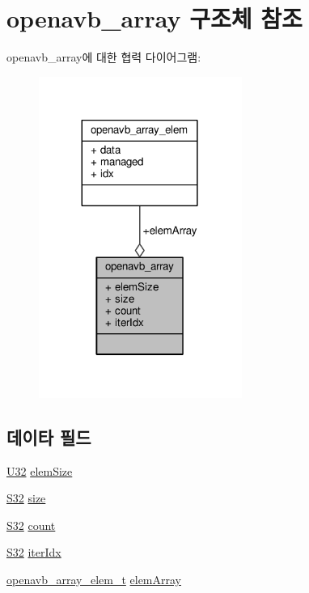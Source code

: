 \hypertarget{structopenavb__array}{}\section{openavb\+\_\+array 구조체 참조}
\label{structopenavb__array}


openavb\+\_\+array에 대한 협력 다이어그램\+:
\nopagebreak
\begin{figure}[H]
\begin{center}
\leavevmode
\includegraphics[width=188pt]{structopenavb__array__coll__graph}
\end{center}
\end{figure}
\subsection*{데이타 필드}
\begin{DoxyCompactItemize}
\item 
\hyperlink{openavb__types__base__pub_8h_a696390429f2f3b644bde8d0322a24124}{U32} \hyperlink{structopenavb__array_a838e119281056414fd5e0641cf388263}{elem\+Size}
\item 
\hyperlink{openavb__types__base__pub_8h_a39c786017723555afb9e8b85accec0de}{S32} \hyperlink{structopenavb__array_a1d835f722a85dc94fbdee4f0a3179038}{size}
\item 
\hyperlink{openavb__types__base__pub_8h_a39c786017723555afb9e8b85accec0de}{S32} \hyperlink{structopenavb__array_a18710850aec6737679ffcc04a45ab989}{count}
\item 
\hyperlink{openavb__types__base__pub_8h_a39c786017723555afb9e8b85accec0de}{S32} \hyperlink{structopenavb__array_ad1f7c3e14c5a004255c9dfff0891f232}{iter\+Idx}
\item 
\hyperlink{openavb__array_8h_a7c60fa84de85ea9a4ccf5c1b89f24504}{openavb\+\_\+array\+\_\+elem\+\_\+t} \hyperlink{structopenavb__array_ad315cbed9826617bd40c9b0bb291d8fc}{elem\+Array}
\end{DoxyCompactItemize}


